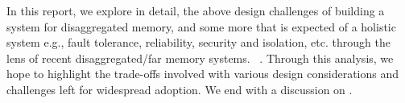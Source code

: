 In this report, we explore in detail, the above design 
challenges of building a system for disaggregated memory, 
and some more that is expected of a holistic system e.g., 
fault tolerance, reliability, security and isolation, etc.
through the lens of recent disaggregated/far memory systems.
~\cite{infiniswap,zswap,leap,fastswap,legoos,kona,aifm,semeru,
remregions,literdma}. Through this analysis, we hope to 
highlight the trade-offs involved with various design 
considerations and challenges left for widespread adoption.
We end with a discussion on \todo{}.
